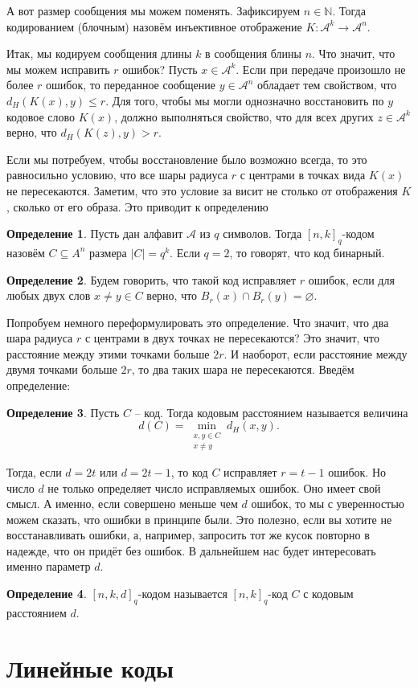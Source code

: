 \documentclass[12pt,a4paper,oneside]{book}
\theoremstyle{definition}
\newtheorem*{defn}{\color{yellow!30!red} Определение}
\renewcommand{\leq}{\leqslant}
\newcommand{\mc}[1]{\mathcal{#1}}
\newcommand{\N}{\mathbb N}
\def\dfn{\begin{defn}}
\def\edfn{\end{defn}}
\begin{document}
А вот размер сообщения мы можем поменять. Зафиксируем $n\in \N$. Тогда кодированием (блочным) назовём инъективное  отображение $K\colon \mc A^k \to \mc A^n$.

Итак, мы кодируем сообщения длины $k$ в сообщения блины $n$. Что значит, что мы можем исправить $r$ ошибок? Пусть $x\in \mc A^k$. Если при передаче произошло не более $r$ ошибок, то переданное сообщение $y \in \mc A^n$ обладает тем свойством, что $d_H(K(x),y)\leq r$. Для того, чтобы мы могли однозначно восстановить по $y$ кодовое слово $K(x)$, должно выполняться свойство, что для всех других $z\in \mc A^k$ верно, что $d_H(K(z),y) > r$.

Если мы потребуем, чтобы восстановление было возможно всегда, то  это равносильно условию, что все шары радиуса $r$ с центрами в точках вида $K(x)$ не пересекаются. Заметим, что это условие за висит не столько от отображения $K$, сколько от его образа. Это приводит к определению

\dfn Пусть дан алфавит $\mc A$ из $q$ символов. Тогда $[n,k]_q$-кодом назовём  $C \subseteq A^n$ размера $|C|=q^k$.  Если $q=2$, то говорят, что код бинарный.
\edfn

\dfn Будем говорить, что такой код исправляет $r$ ошибок, если для любых двух слов $x\neq y \in C$ верно, что $B_r(x) \cap B_r(y)= \varnothing$. 
\edfn

Попробуем немного переформулировать это определение. Что значит, что два шара радиуса $r$ с центрами в двух точках не пересекаются? Это значит, что расстояние между этими точками больше $2r$. И наоборот, если расстояние между двумя точками больше $2r$, то два таких шара не пересекаются. Введём определение:

\dfn Пусть $C$ -- код. Тогда кодовым расстоянием называется величина
$$d(C)= \min_{\substack{x,y\in C \\ x \neq y}} d_H(x,y).$$
\edfn

Тогда, если $d=2t$ или $d=2t-1$, то код $C$ исправляет  $r=t-1$ ошибок. Но число $d$ не только определяет число исправляемых ошибок. Оно имеет свой смысл. А именно, если совершено меньше чем $d$ ошибок, то мы с уверенностью можем сказать, что ошибки в принципе были. Это полезно, если вы хотите не восстанавливать ошибки, а, например, запросить тот же кусок повторно в надежде, что он придёт без ошибок. В дальнейшем нас будет интересовать именно параметр $d$.

\dfn $[n,k,d]_q$-кодом называется $[n,k]_q$-код $C$ с кодовым расстоянием $d$.
\edfn

\section{Линейные коды}
\end{document}
